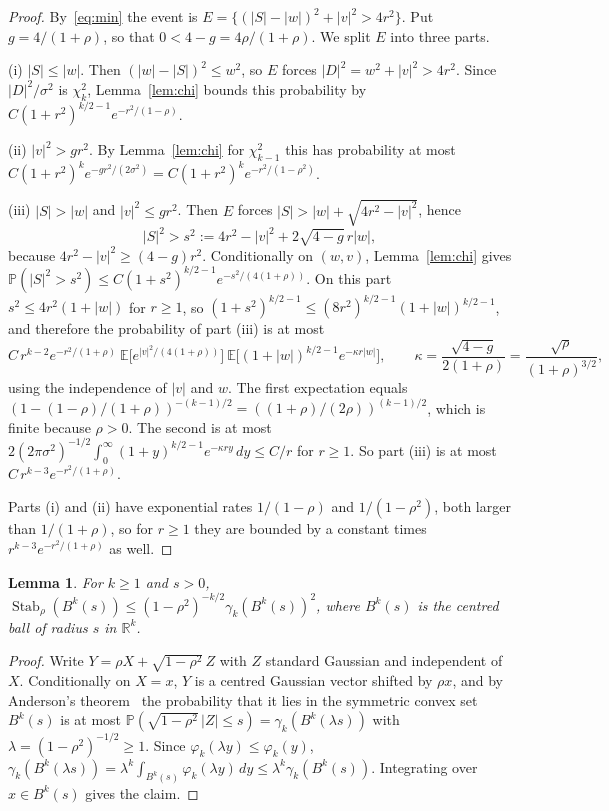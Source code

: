 \documentclass[11pt]{amsart}
\newtheorem{lemma}[theorem]{Lemma}
\theoremstyle{remark}
\newcommand{\R}{\mathbb{R}}
\newcommand{\E}{\mathbb{E}}
\newcommand{\Prob}{\mathbb{P}}
\newcommand{\Stab}{\operatorname{Stab}_\rho}
\begin{document}
\begin{proof}
By~\eqref{eq:min} the event is $E=\{(|S|-|w|)^2+|v|^2>4r^2\}$. Put $g=4/(1+\rho)$, so that $0<4-g=4\rho/(1+\rho)$.
We split $E$ into three parts.

(i) $|S|\le|w|$. Then $(|w|-|S|)^2\le w^2$, so $E$ forces $|D|^2=w^2+|v|^2>4r^2$. Since $|D|^2/\sigma^2$ is
$\chi^2_k$, Lemma~\ref{lem:chi} bounds this probability by $C(1+r^2)^{k/2-1}e^{-r^2/(1-\rho)}$.

(ii) $|v|^2>gr^2$. By Lemma~\ref{lem:chi} for $\chi^2_{k-1}$ this has probability at most
$C(1+r^2)^{k}e^{-gr^2/(2\sigma^2)}=C(1+r^2)^ke^{-r^2/(1-\rho^2)}$.

(iii) $|S|>|w|$ and $|v|^2\le gr^2$. Then $E$ forces $|S|>|w|+\sqrt{4r^2-|v|^2}$, hence
\[
|S|^2>s^2:=4r^2-|v|^2+2\sqrt{4-g}\,r|w|,
\]
because $4r^2-|v|^2\ge(4-g)r^2$. Conditionally on $(w,v)$, Lemma~\ref{lem:chi} gives
$\Prob(|S|^2>s^2)\le C(1+s^2)^{k/2-1}e^{-s^2/(4(1+\rho))}$. On this part $s^2\le4r^2(1+|w|)$ for $r\ge1$, so
$(1+s^2)^{k/2-1}\le(8r^2)^{k/2-1}(1+|w|)^{k/2-1}$, and therefore the probability of part (iii) is at most
\[
C\,r^{k-2}e^{-r^2/(1+\rho)}\ \E\bigl[e^{|v|^2/(4(1+\rho))}\bigr]\ \E\bigl[(1+|w|)^{k/2-1}e^{-\kappa r|w|}\bigr],
\qquad\kappa=\frac{\sqrt{4-g}}{2(1+\rho)}=\frac{\sqrt\rho}{(1+\rho)^{3/2}},
\]
using the independence of $|v|$ and $w$. The first expectation equals $(1-(1-\rho)/(1+\rho))^{-(k-1)/2}=
((1+\rho)/(2\rho))^{(k-1)/2}$, which is finite because $\rho>0$. The second is at most
$2(2\pi\sigma^2)^{-1/2}\int_0^\infty(1+y)^{k/2-1}e^{-\kappa ry}\,dy\le C/r$ for $r\ge1$. So part (iii) is at most
$C\,r^{k-3}e^{-r^2/(1+\rho)}$.

Parts (i) and (ii) have exponential rates $1/(1-\rho)$ and $1/(1-\rho^2)$, both larger than $1/(1+\rho)$, so for
$r\ge1$ they are bounded by a constant times $r^{k-3}e^{-r^2/(1+\rho)}$ as well.
\end{proof}

\begin{lemma}\label{lem:small}
For $k\ge1$ and $s>0$, $\Stab(B^k(s))\le(1-\rho^2)^{-k/2}\gamma_k(B^k(s))^2$, where $B^k(s)$ is the centred ball of
radius $s$ in $\R^k$.
\end{lemma}

\begin{proof}
Write $Y=\rho X+\sqrt{1-\rho^2}\,Z$ with $Z$ standard Gaussian and independent of $X$. Conditionally on $X=x$, $Y$ is a
centred Gaussian vector shifted by $\rho x$, and by Anderson's theorem~\cite{Anderson} the probability that it lies in
the symmetric convex set $B^k(s)$ is at most $\Prob(\sqrt{1-\rho^2}\,|Z|\le s)=\gamma_k(B^k(\lambda s))$ with
$\lambda=(1-\rho^2)^{-1/2}\ge1$. Since $\varphi_k(\lambda y)\le\varphi_k(y)$,
$\gamma_k(B^k(\lambda s))=\lambda^k\int_{B^k(s)}\varphi_k(\lambda y)\,dy\le\lambda^k\gamma_k(B^k(s))$. Integrating over
$x\in B^k(s)$ gives the claim.
\end{proof}
\end{document}
